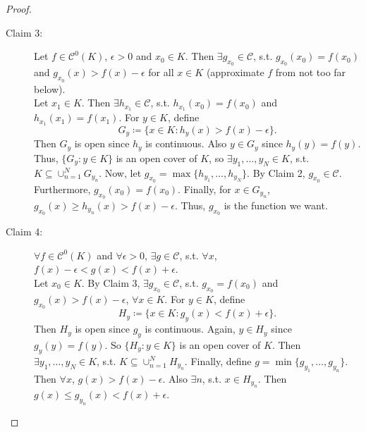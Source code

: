 \documentclass[12pt]{article}
\theoremstyle{plain}
\theoremstyle{definition}
\begin{document}
\begin{proof}
\begin{description}
        \item[Claim 3:] 
        Let $f\in\mathcal{C}^0(K)$, $\epsilon>0$ and $x_0\in K$.
        Then $\exists g_{x_0}\in\mathcal{C}$, s.t. $g_{x_0}(x_0)=f(x_0)$ and
        $g_{x_0}(x)>f(x)-\epsilon$ for all $x\in K$ (approximate $f$ from not
        too far below).\\
        Let $x_1\in K$. Then $\exists h_{x_1}\in\mathcal{C}$, s.t.
        $h_{x_1}(x_0)=f(x_0)$ and $h_{x_1}(x_1)=f(x_1)$.
        For $y\in K$, define
        $$G_y\coloneqq \{x\in K:h_y(x)>f(x)-\epsilon\}.$$
        Then $G_y$ is open since $h_y$ is continuous.
        Also $y\in G_y$ since $h_y(y)=f(y)$.
        Thus, $\{G_y:y\in K\}$ is an open cover of $K$, so $\exists
        y_1,\ldots,y_N\in K$, s.t. $K\subseteq\cup_{n=1}^N G_{y_n}$.
        Now, let $g_{x_0}=\max\{h_{y_1},\ldots,h_{y_N}\}$.
        By Claim 2, $g_{x_0}\in\mathcal{C}$.
        Furthermore, $g_{x_0}(x_0)=f(x_0)$.
        Finally, for $x\in G_{y_n}$, $g_{x_0}(x)\geq h_{y_n}(x)>f(x)-\epsilon$.
        Thus, $g_{x_0}$ is the function we want.

        \item[Claim 4:] $\forall f\in\mathcal{C}^0(K)$ and $\forall \epsilon>0$,
        $\exists g\in\mathcal{C}$, s.t. $\forall x$,
        $f(x)-\epsilon<g(x)<f(x)+\epsilon$.\\
        Let $x_0\in K$.
        By Claim 3, $\exists g_{x_0}\in\mathcal{C}$, s.t. $g_{x_0}=f(x_0)$ and
        $g_{x_0}(x)>f(x)-\epsilon$, $\forall x\in K$.
        For $y\in K$, define
        $$H_y\coloneqq \{x\in K: g_y(x)<f(x)+\epsilon\}.$$
        Then $H_y$ is open since $g_y$ is continuous.
        Again, $y\in H_y$ since $g_y(y)=f(y)$.
        So $\{H_y:y\in K\}$ is an open cover of $K$.
        Then $\exists y_1,\ldots,y_N\in K$, s.t.
        $K\subseteq\cup_{n=1}^N H_{y_n}$.
        Finally, define
        $g=\min\{g_{y_1},\ldots,g_{y_n}\}$.
        Then $\forall x$, $g(x)>f(x)-\epsilon$.
        Also $\exists n$, s.t. $x\in H_{y_n}$.
        Then $g(x)\leq g_{y_n}(x)<f(x)+\epsilon$.
    \end{description}
\end{proof}
\end{document}
